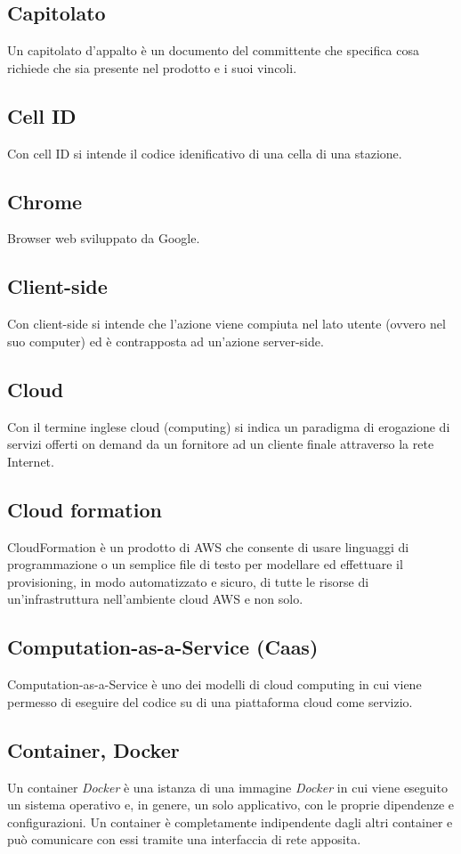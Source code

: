\subsection{Capitolato}  Un capitolato d'appalto è un documento del committente che specifica cosa richiede che sia presente nel prodotto e i suoi vincoli.
\subsection{Cell ID}  Con cell ID si intende il codice idenificativo di una cella di una stazione.
\subsection{Chrome}  Browser web sviluppato da Google.
\subsection{Client-side}  Con client-side si intende che l'azione viene compiuta nel lato utente (ovvero nel suo computer) ed è contrapposta ad un'azione server-side.
\subsection{Cloud}  Con il termine inglese cloud (computing) si indica un paradigma di erogazione di servizi offerti on demand da un fornitore ad un cliente finale attraverso la rete Internet. 
\subsection{Cloud formation}  CloudFormation è un prodotto di AWS che consente di usare linguaggi di programmazione o un semplice file di testo per modellare ed effettuare il provisioning, in modo automatizzato e sicuro, di tutte le risorse di un'infrastruttura nell'ambiente cloud AWS e non solo.
\subsection{Computation-as-a-Service (Caas)}  Computation-as-a-Service è uno dei modelli di cloud computing in cui viene permesso di eseguire del codice su di una piattaforma cloud come servizio.
\subsection{Container, Docker}  Un container \textit{Docker} è una istanza di una immagine \textit{Docker} in cui viene eseguito un sistema operativo e, in genere, un solo applicativo, con le proprie dipendenze e configurazioni. Un container è completamente indipendente dagli altri container e può comunicare con essi tramite una interfaccia di rete apposita.
